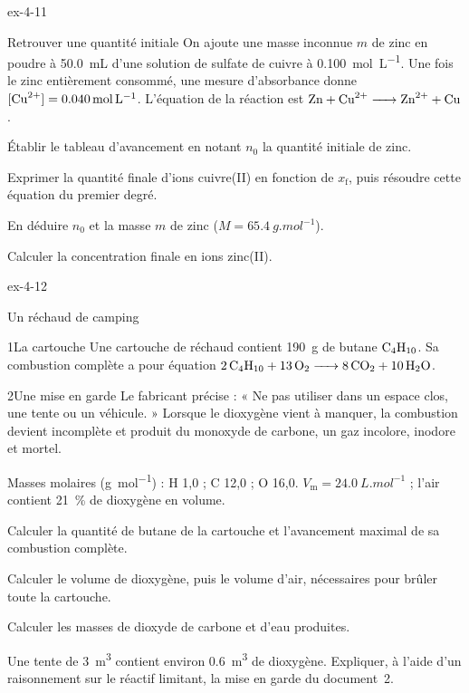 \begin{blocLivre}{ex-4-11}
\begin{exercice}[2]{Retrouver une quantité initiale}
On ajoute une masse inconnue $m$ de zinc en poudre à \qty{50,0}{mL} d'une solution de sulfate de cuivre à \qty{0,100}{mol.L^{-1}}. Une
fois le zinc entièrement consommé, une mesure d'absorbance donne $[\ce{Cu^{2+}}]=\qty{0,040}{mol.L^{-1}}$. L'équation de la réaction est
$\ce{Zn + Cu^{2+} -> Zn^{2+} + Cu}$.
\begin{questions}
\item Établir le tableau d'avancement en notant $n_0$ la quantité initiale de zinc.
\item Exprimer la quantité finale d'ions cuivre(II) en fonction de $x_\mathrm{f}$, puis résoudre cette équation du premier degré.
\item En déduire $n_0$ et la masse $m$ de zinc ($M=\qty{65,4}{g.mol^{-1}}$).
\item Calculer la concentration finale en ions zinc(II).
\end{questions}
\end{exercice}
\end{blocLivre}
\begin{blocLivre}{ex-4-12}
\begin{exercice}[3]{Un réchaud de camping}
\begin{docu}{1}{La cartouche}
Une cartouche de réchaud contient \qty{190}{g} de butane $\ce{C4H10}$. Sa combustion complète a pour équation
$\ce{2C4H10 + 13O2 -> 8CO2 + 10H2O}$.
\end{docu}
\begin{docu}{2}{Une mise en garde}
Le fabricant précise : « Ne pas utiliser dans un espace clos, une tente ou un véhicule. » Lorsque le dioxygène vient à
manquer, la combustion devient incomplète et produit du monoxyde de carbone, un gaz incolore, inodore et mortel.
\end{docu}
\begin{donnees}
Masses molaires (\unit{g.mol^{-1}}) : H 1,0 ; C 12,0 ; O 16,0. $V_\mathrm{m}=\qty{24,0}{L.mol^{-1}}$ ; l'air contient 21~\% de dioxygène en volume.
\end{donnees}
\begin{questions}
\item Calculer la quantité de butane de la cartouche et l'avancement maximal de sa combustion complète.
\item Calculer le volume de dioxygène, puis le volume d'air, nécessaires pour brûler toute la cartouche.
\item Calculer les masses de dioxyde de carbone et d'eau produites.
\item \initiative Une tente de \qty{3}{m^3} contient environ \qty{0,6}{m^3} de dioxygène. Expliquer, à l'aide d'un raisonnement sur le réactif
limitant, la mise en garde du document~2.
\end{questions}
\end{exercice}
\end{blocLivre}
